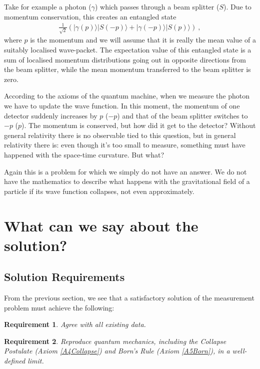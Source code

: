 \documentclass[superscriptaddress,floatfix,nofootinbib,12pt]{revtex4-2}
\newtheorem{requirement}{Requirement}
\begin{document}
Take for example a photon ($\gamma$) which passes through a beam splitter ($S$). Due to momentum conservation, this creates an entangled state 
\begin{eqnarray}
\frac{1}{\sqrt{2}}\left(|\gamma(p)\rangle |S(-p) \rangle + |\gamma(-p)\rangle |S(p)\rangle \right)~,
\end{eqnarray}
where $p$ is the momentum and we will assume that it is really the mean value of a suitably localised wave-packet. The expectation value of this entangled state is a sum of localised momentum distributions going out in opposite directions from the beam splitter, while the mean momentum transferred to the beam splitter is zero.

According to the axioms of the quantum machine, when we measure the photon we have to update the wave function. In this moment, the momentum of one detector suddenly increases by $p$ ($-p$) and that of the beam splitter switches to $-p$ ($p$). The momentum is conserved, but how did it get to the detector? Without general relativity there is no observable tied to this question, but in general relativity there is: even though it's too small to measure, something must have happened with the space-time curvature. But what?

Again this is a problem for which we simply do not have an answer. We do not have the mathematics to describe what happens with the gravitational field of a particle if its wave function collapses, not even approximately. 

\section{What can we say about the solution?}

\subsection{Solution Requirements}

From the previous section, we see that a satisfactory solution of the measurement problem must achieve the following:

\begin{requirement}\label{R1}
  Agree with all existing data.
\end{requirement}

\begin{requirement}\label{R2}
  Reproduce quantum mechanics, including the Collapse Postulate (Axiom \ref{A4Collapse}) and Born's Rule (Axiom \ref{A5Born}), in a well-defined limit.
\end{requirement}
\end{document}
